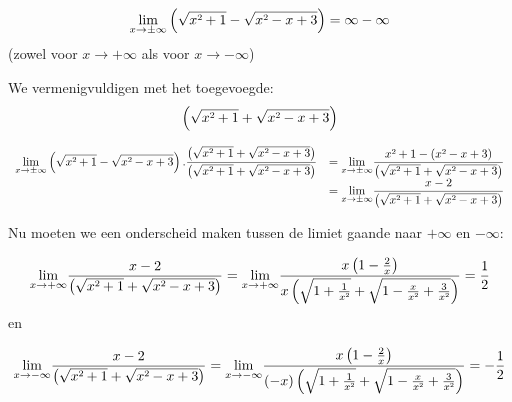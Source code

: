 \begin{voorbeeld}
\begin{equation*}
{\displaystyle {\displaystyle \lim_{x\to\pm\infty}}\left(\sqrt{x\text{\texttwosuperior}+1}-\sqrt{x\text{\texttwosuperior}-x+3}\right)=\infty-\infty}
\end{equation*}
(zowel voor $x\rightarrow+\infty$ als voor $x\rightarrow-\infty$)

We vermenigvuldigen met het toegevoegde: \begin{equation*}
\left(\sqrt{x\text{\texttwosuperior}+1}+\sqrt{x\text{\texttwosuperior}-x+3}\right)
\end{equation*}

\begin{equation*}
 \begin{array}{cl}
 				{\displaystyle {\displaystyle \lim_{x\to\pm\infty}}\left(\sqrt{x\text{\texttwosuperior}+1}-\sqrt{x\text{\texttwosuperior}-x+3}\right).\frac{\left(\sqrt{x\text{\texttwosuperior}+1}+\sqrt{x\text{\texttwosuperior}-x+3}\right)}{\left(\sqrt{x\text{\texttwosuperior}+1}+\sqrt{x\text{\texttwosuperior}-x+3}\right)}} & {\displaystyle ={\displaystyle \lim_{x\to\pm\infty}}\frac{x\text{\texttwosuperior}+1-(x\text{\texttwosuperior}-x+3)}{\left(\sqrt{x\text{\texttwosuperior}+1}+\sqrt{x\text{\texttwosuperior}-x+3}\right)}}\\
 				 & {\displaystyle ={\displaystyle \lim_{x\to\pm\infty}}\frac{x-2}{\left(\sqrt{x\text{\texttwosuperior}+1}+\sqrt{x\text{\texttwosuperior}-x+3}\right)}}
\end{array}
\end{equation*}

Nu moeten we een onderscheid maken tussen de limiet gaande naar $+\infty$
en $-\infty$:

\begin{equation*}
{\displaystyle {\displaystyle \lim_{x\to+\infty}}\frac{x-2}{\left(\sqrt{x\text{\texttwosuperior}+1}+\sqrt{x\text{\texttwosuperior}-x+3}\right)}={\displaystyle \lim_{x\to+\infty}}\frac{x\left(1-\frac{2}{x}\right)}{x\left(\sqrt{1+\frac{1}{x\text{\texttwosuperior}}}+\sqrt{1-\frac{x}{x\text{\texttwosuperior}}+\frac{3}{x\text{\texttwosuperior}}}\right)}=\frac{1}{2}}
\end{equation*} en

\begin{equation*}
{\displaystyle {\displaystyle \lim_{x\to-\infty}}\frac{x-2}{\left(\sqrt{x\text{\texttwosuperior}+1}+\sqrt{x\text{\texttwosuperior}-x+3}\right)}={\displaystyle \lim_{x\to-\infty}}\frac{x\left(1-\frac{2}{x}\right)}{(-x)\left(\sqrt{1+\frac{1}{x\text{\texttwosuperior}}}+\sqrt{1-\frac{x}{x\text{\texttwosuperior}}+\frac{3}{x\text{\texttwosuperior}}}\right)}=-\frac{1}{2}}
\end{equation*}

\end{voorbeeld}

